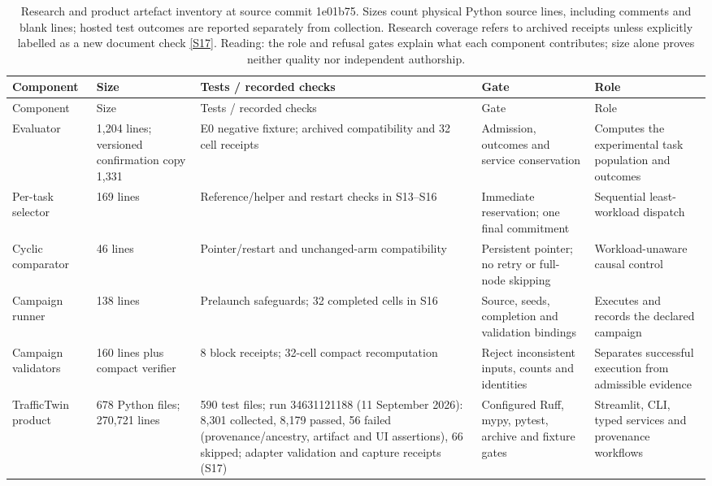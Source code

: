 \documentclass[12pt,a4paper]{article}
\begin{document}
\begingroup
\singlespacing\footnotesize\setlength{\tabcolsep}{3pt}
\renewcommand{\thetable}{A1}
\begin{xltabular}{\textwidth}{@{}YYYYY@{}}
\caption[Software components and gates]{Research and product artefact inventory at source commit 1e01b75. Sizes count physical Python source lines, including comments and blank lines; hosted test outcomes are reported separately from collection. Research coverage refers to archived receipts unless explicitly labelled as a new document check \hyperref[source-s17]{[S17]}. Reading: the role and refusal gates explain what each component contributes; size alone proves neither quality nor independent authorship.}\label{tab:A1} \\
\toprule
Component & Size & Tests / recorded checks & Gate & Role \\
\midrule\endfirsthead
\toprule
Component & Size & Tests / recorded checks & Gate & Role \\
\midrule\endhead
\bottomrule\endfoot
Evaluator & 1,204 lines; versioned confirmation copy 1,331 & E0 negative fixture; archived compatibility and 32 cell receipts & Admission, outcomes and service conservation & Computes the experimental task population and outcomes \\
Per-task selector & 169 lines & Reference/helper and restart checks in S13--S16 & Immediate reservation; one final commitment & Sequential least-workload dispatch \\
Cyclic comparator & 46 lines & Pointer/restart and unchanged-arm compatibility & Persistent pointer; no retry or full-node skipping & Workload-unaware causal control \\
Campaign runner & 138 lines & Prelaunch safeguards; 32 completed cells in S16 & Source, seeds, completion and validation bindings & Executes and records the declared campaign \\
Campaign validators & 160 lines plus compact verifier & 8 block receipts; 32-cell compact recomputation & Reject inconsistent inputs, counts and identities & Separates successful execution from admissible evidence \\
TrafficTwin product & 678 Python files; 270,721 lines & 590 test files; run 34631121188 (11 September 2026): 8,301 collected, 8,179 passed, 56 failed (provenance/ancestry, artifact and UI assertions), 66 skipped; adapter validation and capture receipts (S17) & Configured Ruff, mypy, pytest, archive and fixture gates & Streamlit, CLI, typed services and provenance workflows \\
\end{xltabular}
\endgroup
\end{document}
